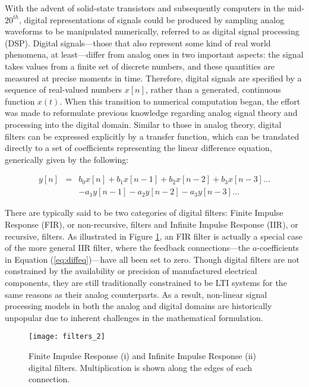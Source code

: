 With the advent of solid-state transistors and subsequently computers in the mid-$20^{th}$, digital representations of signals could be produced by sampling analog waveforms to be manipulated numerically, referred to as digital signal processing (DSP).
Digital signals---those that also represent some kind of real world phenomena, at least---differ from analog ones in two important aspects: the signal takes values from a finite set of discrete numbers, and these quantities are measured at precise moments in time.
Therefore, digital signals are specified by a sequence of real-valued numbers $x[n]$, rather than a generated, continuous function $x(t)$.
When this transition to numerical computation began, the effort was made to reformulate previous knowledge regarding analog signal theory and processing into the digital domain.
Similar to those in analog theory, digital filters can be expressed explicitly by a transfer function, which can be translated directly to a set of coefficients representing the linear difference equation, generically given by the following:

\begin{equation}
\label{eq:diffeq}
\begin{array}{rcr}
y[n] & = & b_0x[n] + b_1x[n-1] + b_2x[n-2] + b_3x[n-3] \ldots \\
 & & - a_1y[n-1] - a_2y[n-2] - a_3y[n-3] \ldots
\end{array}
\end{equation}

There are typically said to be two categories of digital filters: Finite Impulse Response (FIR), or non-recursive, filters and Infinite Impulse Response (IIR), or recursive, filters.
As illustrated in Figure \ref{fig:filters}, an FIR filter is actually a special case of the more general IIR filter, where the feedback connections---the $a$-coefficients in Equation (\ref{eq:diffeq})---have all been set to zero.
Though digital filters are not constrained by the availability or precision of manufactured electrical components, they are still traditionally constrained to be LTI systems for the same reasons as their analog counterparts.
As a result, non-linear signal processing models in both the analog and digital domains are historically unpopular due to inherent challenges in the mathematical formulation.

\begin{figure}[!t]
\centering
\texttt{[image: filters\_2]}
\caption{\small{Finite Impulse Response (i) and Infinite Impulse Response (ii) digital filters. Multiplication is shown along the edges of each connection.}}
\label{fig:filters}
\end{figure}


